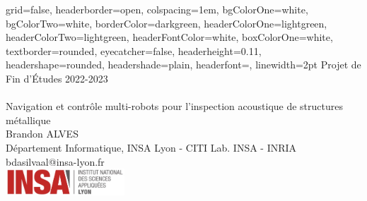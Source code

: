 \documentclass[a0paper,portrait]{baposter}
\begin{document}
	\begin{poster}
		{
			grid=false,
			headerborder=open, %
			colspacing=1em, %
			bgColorOne=white, %
			bgColorTwo=white, %
			borderColor=darkgreen, %
			headerColorOne=lightgreen, %
			headerColorTwo=lightgreen, %
			headerFontColor=white, %
			boxColorOne=white, %
			textborder=rounded, %
			eyecatcher=false, %
			headerheight=0.11\textheight, %
			headershape=rounded, %
			headershade=plain,
			headerfont=\Large\textsf, %
			linewidth=2pt %
		}
		{}
		{
			{\small Projet de Fin d'Études 2022-2023}
			\sf\vspace{0.3em}\\
			\\\textsf
			{Navigation et contrôle multi-robots pour l'inspection acoustique de structures métallique}
		}
		{
			\sf\vspace{0.5em}\\
			Brandon ALVES
			\vspace{0.1em}\\
			\small{
				Département Informatique, INSA Lyon - CITI Lab. INSA - INRIA
				\vspace{0.2em}\\
				bdasilvaal@insa-lyon.fr
				\vspace{0.2em}\\
			}
		}
		{
			\hspace{0.5cm}
			\includegraphics[height=1cm]{graphics/insa.jpg}
}
\end{poster}
\end{document}
